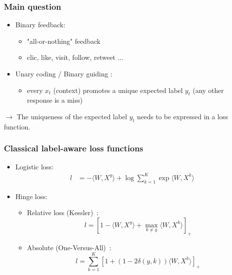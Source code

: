 \documentclass{beamer}
\begin{document}
\begin{frame}\frametitle{Main question}
		\begin{itemize}
			\item Binary feedback:
			\begin{itemize}
				\item "all-or-nothing" feedback
				\item clic, like, visit, follow, retweet ...
			\end{itemize}
			\item Unary coding / Binary guiding : 
			\begin{itemize}
				\item every $x_t$ (context) promotes a unique expected label $y_t$
				(any other response is a miss)
			\end{itemize}
		\end{itemize}
		$\rightarrow$ The uniqueness of the expected label $y_t$ needs to be expressed in a loss function.
\end{frame}

\begin{frame}\frametitle{Classical label-aware loss functions}
	\begin{itemize}
		\item Logistic loss:
		\begin{align*} 
		l &= -  \langle W, X^y \rangle + \log \sum_{k=1}^K \exp\langle W, X^k\rangle
		\end{align*}
		\item Hinge loss: 
		\begin{itemize}
			\item Relative loss (Kessler)~:
			$$l =  \left[ 1 -  \langle W, X^y \rangle + \max_{k \neq y} \langle W, X^k\rangle\right]_+$$
			\item Absolute (One-Versus-All)~:
			$$l = \sum_{k=1}^K \left[1 + (1 - 2 \delta(y,k)) \langle W, X^k\rangle\right]_+$$
		\end{itemize}
	\end{itemize}
	
\end{frame}
\end{document}
